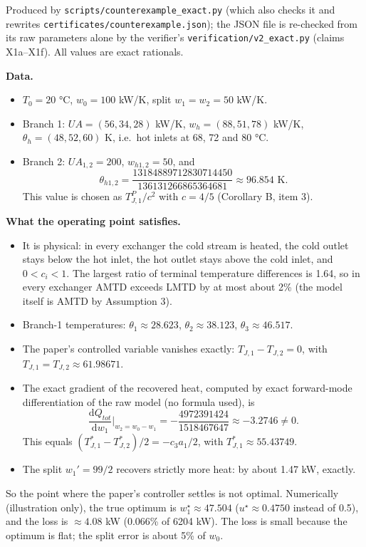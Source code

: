 \documentclass[11pt,a4paper]{report}
\begin{document}
Produced by \texttt{scripts/counterexample\_exact.py} (which also checks it and rewrites
\texttt{certificates/counterexample.json}); the JSON file is re-checked from its raw parameters alone by the verifier's
\texttt{verification/v2\_exact.py} (claims X1a--X1f). All values are exact rationals.

\textbf{Data.}
\begin{itemize}
\item \(T_0 = 20\) °C, \(w_0 = 100\) kW/K, split \(w_1 = w_2 = 50\) kW/K.
\item Branch 1: \(UA = (56, 34, 28)\) kW/K, \(w_h = (88, 51, 78)\) kW/K, \(\theta_h = (48, 52, 60)\) K, i.e.~hot
inlets at 68, 72 and 80 °C.
\item Branch 2: \(UA_{1,2} = 200\), \(w_{h1,2} = 50\), and
\[\theta_{h1,2} = \frac{13184889712830714450}{136131266865364681} \approx 96.854 \text{ K}.\]
This value is chosen as \(T^P_{J,1}/c^2\) with \(c = 4/5\) (Corollary B, item 3).
\end{itemize}

\textbf{What the operating point satisfies.}
\begin{itemize}
\item It is physical: in every exchanger the cold stream is heated, the cold outlet stays below the hot inlet, the hot
outlet stays above the cold inlet, and \(0 < c_i < 1\). The largest ratio of terminal temperature differences is 1.64,
so in every exchanger AMTD exceeds LMTD by at most about 2\% (the model itself is AMTD by Assumption 3).
\item Branch-1 temperatures: \(\theta_1 \approx 28.623\), \(\theta_2 \approx 38.123\), \(\theta_3 \approx 46.517\).
\item The paper's controlled variable vanishes exactly: \(T_{J,1} - T_{J,2} = 0\), with
\(T_{J,1} = T_{J,2} \approx 61.98671\).
\item The exact gradient of the recovered heat, computed by exact forward-mode differentiation of the raw model (no
formula used), is
\[\frac{\mathrm{d}Q_{tot}}{\mathrm{d}w_1}\Big|_{w_2 = w_0 - w_1} = -\frac{4972391424}{1518467647} \approx -3.2746 \ne 0.\]
This equals \((T^*_{J,1} - T^*_{J,2})/2 = -c_3a_1/2\), with \(T^*_{J,1} \approx 55.43749\).
\item The split \(w_1' = 99/2\) recovers strictly more heat: by about 1.47 kW, exactly.
\end{itemize}

So the point where the paper's controller settles is not optimal. Numerically (illustration only), the true optimum is
\(w_1^\star \approx 47.504\) (\(u^\star \approx 0.4750\) instead of 0.5), and the loss is \(\approx 4.08\) kW
(0.066\% of 6204 kW). The loss is small because the optimum is flat; the split error is about 5\% of \(w_0\).
\end{document}

